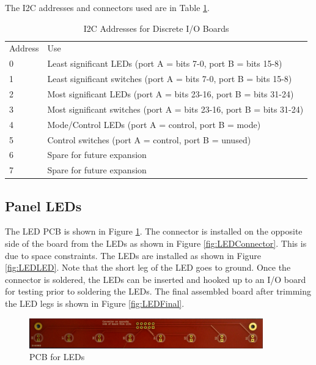 \documentclass[10pt, openany]{book}
\begin{document}
The I2C addresses and connectors used are in Table \ref{tbl:i2c}.

\begin{table}
  \caption{I2C Addresses for Discrete I/O Boards}
  \label{tbl:i2c}
  \centering
  \begin{tabular}{|l|l|}
    \hline
    Address & Use\\
    0 & Least significant LEDs (port A = bits 7-0, port B = bits 15-8)\\
    1 & Least significant switches (port A = bits 7-0, port B = bits 15-8)\\
    2 & Most significant LEDs (port A = bits 23-16, port B = bits 31-24)\\
    3 & Most significant switches (port A = bits 23-16, port B = bits 31-24)\\
    4 & Mode/Control LEDs (port A = control, port B = mode)\\
    5 & Control switches (port A = control, port B = unused)\\
    6 & Spare for future expansion\\
    7 & Spare for future expansion\\
    \hline
  \end{tabular}
\end{table}

\subsection{Panel LEDs}
\label{subsec:PanelLED}
The LED PCB is shown in Figure \ref{fig:LEDPCB}.  The connector is installed on the opposite side of the board from the LEDs as shown in Figure \ref{fig:LEDConnector}.  This is due to space constraints.  The LEDs are installed as shown in Figure \ref{fig:LEDLED}.  Note that the short leg of the LED goes to ground.  Once the connector is soldered, the LEDs can be inserted and hooked up to an I/O board for testing prior to soldering the LEDs.  The final assembled board after trimming the LED legs is shown in Figure \ref{fig:LEDFinal}.

\begin{figure}[ht!]
  \centering
  \includegraphics[width=0.9\textwidth]{../Pict/LED-Board.jpg}
  \caption{PCB for LEDs}
  \label{fig:LEDPCB}
\end{figure}
\end{document}
